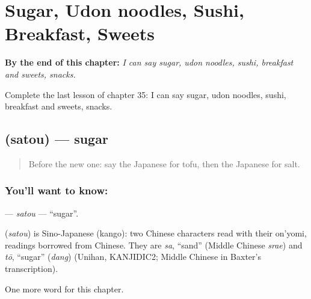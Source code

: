 
\chapter{Sugar, Udon noodles, Sushi, Breakfast, Sweets}
\label{ch:ja-sugar-udon-noodles-sushi-breakfast-sweets}

\begin{chapteropening}
\textbf{By the end of this chapter:} \emph{I can say sugar, udon noodles, sushi, breakfast and sweets, snacks.}

Complete the last lesson of chapter 35: I can say sugar, udon noodles, sushi, breakfast and sweets, snacks.
\end{chapteropening}

\section[\texorpdfstring{\ja{さとう} (satou)}{さとう (satou)}]{ (satou) — sugar}

\label{lesson:JA-C35-satou}



\begin{quote}
Before the new one: say the Japanese for tofu, then the Japanese for salt.
\end{quote}

\subsection*{You'll want to know: }
\textbf{} — \emph{satou} — \textquotedblleft{}sugar\textquotedblright{}.

\begin{cousinweb}
\textbf{} (\emph{satou}) is Sino-Japanese (kango): two Chinese characters read with their on'yomi, readings borrowed from Chinese. They are \emph{sa}, \textquotedblleft{}sand\textquotedblright{} (Middle Chinese \emph{srae}) and \emph{tō}, \textquotedblleft{}sugar\textquotedblright{} (\emph{dang}) (Unihan, KANJIDIC2; Middle Chinese in Baxter's transcription).
\end{cousinweb}

\begin{grammarlens}[title={What you've built}]
One more word for this chapter.
\end{grammarlens}

